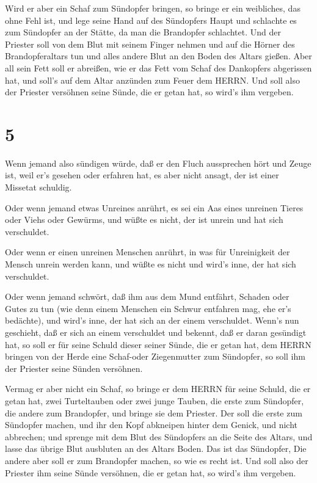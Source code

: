  Wird er aber ein Schaf zum Sündopfer bringen, so bringe er
ein weibliches, das ohne Fehl ist,  und lege seine Hand auf
des Sündopfers Haupt und schlachte es zum Sündopfer an der Stätte, da
man die Brandopfer schlachtet.  Und der Priester soll von
dem Blut mit seinem Finger nehmen und auf die Hörner des
Brandopferaltars tun und alles andere Blut an den Boden des Altars
gießen.  Aber all sein Fett soll er abreißen, wie er das
Fett vom Schaf des Dankopfers abgerissen hat, und soll's auf dem Altar
anzünden zum Feuer dem HERRN. Und soll also der Priester versöhnen seine
Sünde, die er getan hat, so wird's ihm vergeben.

\hypertarget{section-4}{%
\section{5}\label{section-4}}

 Wenn jemand also sündigen würde, daß er den Fluch
aussprechen hört und Zeuge ist, weil er's gesehen oder erfahren hat, es
aber nicht ansagt, der ist einer Missetat schuldig.

 Oder wenn jemand etwas Unreines anrührt, es sei ein Aas
eines unreinen Tieres oder Viehs oder Gewürms, und wüßte es nicht, der
ist unrein und hat sich verschuldet.

 Oder wenn er einen unreinen Menschen anrührt, in was für
Unreinigkeit der Mensch unrein werden kann, und wüßte es nicht und
wird's inne, der hat sich verschuldet.

 Oder wenn jemand schwört, daß ihm aus dem Mund entfährt,
Schaden oder Gutes zu tun (wie denn einem Menschen ein Schwur entfahren
mag, ehe er's bedächte), und wird's inne, der hat sich an der einem
verschuldet.  Wenn's nun geschieht, daß er sich an einem
verschuldet und bekennt, daß er daran gesündigt hat,  so
soll er für seine Schuld dieser seiner Sünde, die er getan hat, dem
HERRN bringen von der Herde eine Schaf-oder Ziegenmutter zum Sündopfer,
so soll ihm der Priester seine Sünden versöhnen.

 Vermag er aber nicht ein Schaf, so bringe er dem HERRN für
seine Schuld, die er getan hat, zwei Turteltauben oder zwei junge
Tauben, die erste zum Sündopfer, die andere zum Brandopfer, 
und bringe sie dem Priester. Der soll die erste zum Sündopfer machen,
und ihr den Kopf abkneipen hinter dem Genick, und nicht abbrechen;
 und sprenge mit dem Blut des Sündopfers an die Seite des
Altars, und lasse das übrige Blut ausbluten an des Altars Boden. Das ist
das Sündopfer,  Die andere aber soll er zum Brandopfer
machen, so wie es recht ist. Und soll also der Priester ihm seine Sünde
versöhnen, die er getan hat, so wird's ihm vergeben.

